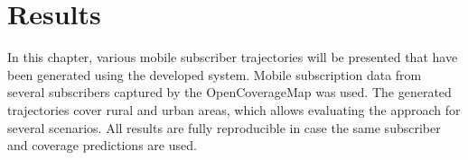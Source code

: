 \documentclass[master,english]{hgbthesis}
\begin{document}
\chapter{Results}
\label{cha:results}
In this chapter, various mobile subscriber trajectories will be presented that have been generated using the developed system. Mobile subscription data from several subscribers captured by the OpenCoverageMap was used. The generated trajectories cover rural and urban areas, which allows evaluating the approach for several scenarios. All results are fully reproducible in case the same subscriber and coverage predictions are used.
\end{document}
